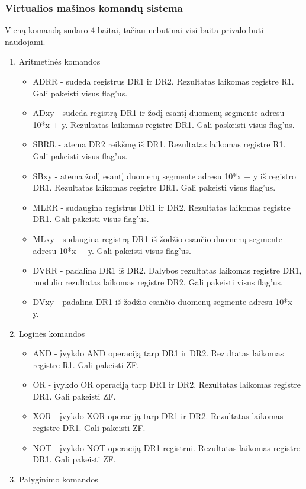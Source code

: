 	\subsubsection{Virtualios mašinos komandų sistema}
	Vieną komandą sudaro 4 baitai, tačiau nebūtinai visi baita privalo būti naudojami.
	\begin{enumerate}
	\item Aritmetinės komandos
		\begin{itemize}
		\item ADRR - sudeda registrus DR1 ir DR2. Rezultatas laikomas registre R1. Gali pakeisti visus flag'us.
		\item ADxy - sudeda registrą DR1 ir žodį esantį duomenų segmente adresu 10*x + y. Rezultatas laikomas registre DR1. Gali paskeisti visus flag'us.
		\item SBRR - atema DR2 reikšmę iš DR1. Rezultatas laikomas registre R1. Gali pakeisti visus flag'us.
		\item SBxy - atema žodį esantį duomenų segmente adresu 10*x + y iš registro DR1. Rezultatas laikomas registre DR1. Gali pakeisti visus flag'us.
		\item MLRR - sudaugina registrus DR1 ir DR2. Rezultatas laikomas registre DR1. Gali pakeisti visus flag'us.
		\item MLxy - sudaugina registrą DR1 iš žodžio esančio duomenų segmente adresu 10*x + y. Gali pakeisti visus flag'us.
		\item DVRR - padalina DR1 iš DR2. Dalybos rezultatas laikomas registre DR1, modulio rezultatas laikomas registre DR2. Gali pakeisti visus flag'us.
		\item DVxy - padalina DR1 iš žodžio esančio duomenų segmente adresu 10*x - y.
		\end{itemize}
	\item Loginės komandos
		\begin{itemize}
		\item AND - įvykdo AND operaciją tarp DR1 ir DR2. Rezultatas laikomas registre R1. Gali pakeisti ZF.
		\item OR - įvykdo OR operaciją tarp DR1 ir DR2. Rezultatas laikomas registre DR1. Gali pakeisti ZF.
		\item XOR - įvykdo XOR operaciją tarp DR1 ir DR2. Rezultatas laikomas registre DR1. Gali pakeisti ZF.
		\item NOT - įvykdo NOT operaciją DR1 registrui. Rezultatas laikomas registre DR1. Gali pakeisti ZF.
		\end{itemize}
	\item Palyginimo komandos

\end{enumerate}
